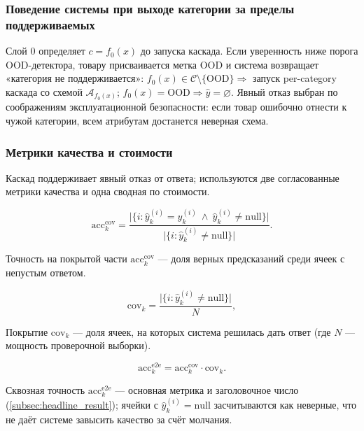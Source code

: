 \subsubsection{Поведение системы при выходе категории за пределы поддерживаемых}

Слой 0 определяет $c = f_0(x)$ до запуска каскада. Если уверенность ниже порога OOD-детектора, товару присваивается метка OOD и система возвращает «категория не поддерживается»: $f_0(x) \in \mathcal{C} \setminus \{\text{OOD}\} \Rightarrow$ запуск per-category каскада со схемой $\mathcal{A}_{f_0(x)}$; $f_0(x) = \text{OOD} \Rightarrow \hat{y} = \varnothing$. Явный отказ выбран по соображениям эксплуатационной безопасности: если товар ошибочно отнести к чужой категории, всем атрибутам достанется неверная схема.

\subsubsection{Метрики качества и стоимости}
\label{subsubsec:metrics}

Каскад поддерживает явный отказ от ответа; используются две согласованные метрики качества и одна сводная по стоимости.

\begin{equation}
\label{eq:2.6}
\text{acc}_k^{\text{cov}} = \frac{\bigl|\{i : \hat{y}_k^{(i)} = y_k^{(i)} \ \wedge\ \hat{y}_k^{(i)} \neq \text{null}\}\bigr|}{\bigl|\{i : \hat{y}_k^{(i)} \neq \text{null}\}\bigr|}.
\end{equation}

Точность на покрытой части $\text{acc}_k^{\text{cov}}$ — доля верных предсказаний среди ячеек с непустым ответом.

\begin{equation}
\label{eq:2.7}
\text{cov}_k = \frac{\bigl|\{i : \hat{y}_k^{(i)} \neq \text{null}\}\bigr|}{N},
\end{equation}

Покрытие $\text{cov}_k$ — доля ячеек, на которых система решилась дать ответ (где $N$ — мощность проверочной выборки).

\begin{equation}
\label{eq:2.8}
\text{acc}_k^{\text{e2e}} = \text{acc}_k^{\text{cov}} \cdot \text{cov}_k.
\end{equation}

Сквозная точность $\text{acc}_k^{\text{e2e}}$ — основная метрика и заголовочное число (\ref{subsec:headline_result}); ячейки с $\hat{y}_k^{(i)} = \text{null}$ засчитываются как неверные, что не даёт системе завысить качество за счёт молчания.

